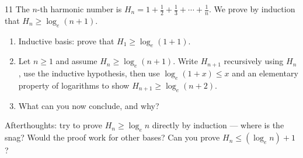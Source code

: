 \begin{exercise}{11}
    The $n$-th harmonic number is $H_n = 1+\frac12+\frac13+\cdots+\frac1n$. We
    prove by induction that $H_n\ge\log_e(n+1)$.
    \begin{enumerate}[label=(\roman*)]
        \item Inductive basis: prove that $H_1\ge\log_e(1+1)$.
        \item Let $n\ge1$ and assume $H_n\ge\log_e(n+1)$. Write $H_{n+1}$
              recursively using $H_n$, use the inductive hypothesis, then use
              $\log_e(1+x)\le x$ and an elementary property of logarithms to show
              $H_{n+1}\ge\log_e(n+2)$.
        \item What can you now conclude, and why?
    \end{enumerate}
    Afterthoughts: try to prove $H_n\ge\log_e n$ directly by induction --- where
    is the snag? Would the proof work for other bases? Can you prove
    $H_n\le(\log_e n)+1$?
\end{exercise}
